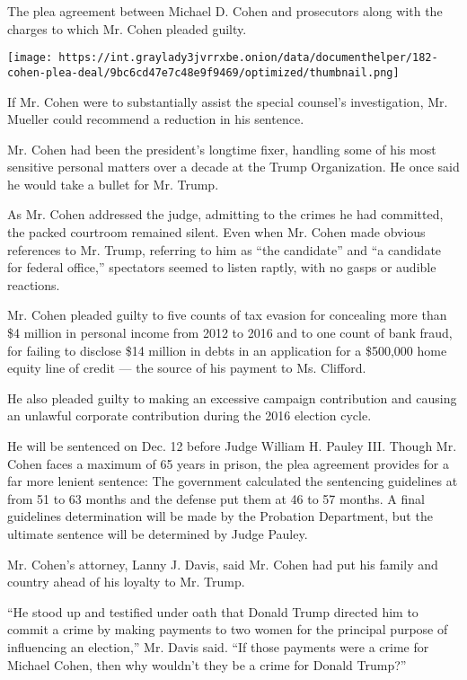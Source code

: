The plea agreement between Michael D. Cohen and prosecutors along with
the charges to which Mr. Cohen pleaded guilty.

\texttt{[image: https://int.graylady3jvrrxbe.onion/data/documenthelper/182-cohen-plea-deal/9bc6cd47e7c48e9f9469/optimized/thumbnail.png]}

If Mr. Cohen were to substantially assist the special counsel's
investigation, Mr. Mueller could recommend a reduction in his sentence.

Mr. Cohen had been the president's longtime fixer, handling some of his
most sensitive personal matters over a decade at the Trump Organization.
He once said he would take a bullet for Mr. Trump.

As Mr. Cohen addressed the judge, admitting to the crimes he had
committed, the packed courtroom remained silent. Even when Mr. Cohen
made obvious references to Mr. Trump, referring to him as ``the
candidate'' and ``a candidate for federal office,'' spectators seemed to
listen raptly, with no gasps or audible reactions.

Mr. Cohen pleaded guilty to five counts of tax evasion for concealing
more than \$4 million in personal income from 2012 to 2016 and to one
count of bank fraud, for failing to disclose \$14 million in debts in an
application for a \$500,000 home equity line of credit --- the source of
his payment to Ms. Clifford.

He also pleaded guilty to making an excessive campaign contribution and
causing an unlawful corporate contribution during the 2016 election
cycle.

He will be sentenced on Dec. 12 before Judge William H. Pauley III.
Though Mr. Cohen faces a maximum of 65 years in prison, the plea
agreement provides for a far more lenient sentence: The government
calculated the sentencing guidelines at from 51 to 63 months and the
defense put them at 46 to 57 months. A final guidelines determination
will be made by the Probation Department, but the ultimate sentence will
be determined by Judge Pauley.

Mr. Cohen's attorney, Lanny J. Davis, said Mr. Cohen had put his family
and country ahead of his loyalty to Mr. Trump.

``He stood up and testified under oath that Donald Trump directed him to
commit a crime by making payments to two women for the principal purpose
of influencing an election,'' Mr. Davis said. ``If those payments were a
crime for Michael Cohen, then why wouldn't they be a crime for Donald
Trump?''

